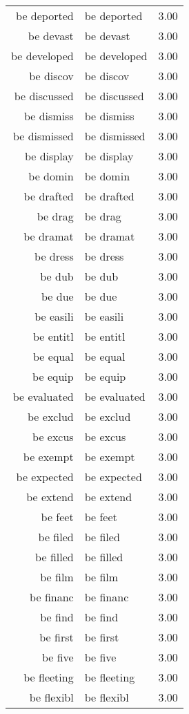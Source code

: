 \begin{table}[ht]
\begin{tabular}{rlr}
  be deported & be deported & 3.00 \\ 
  be devast & be devast & 3.00 \\ 
  be developed & be developed & 3.00 \\ 
  be discov & be discov & 3.00 \\ 
  be discussed & be discussed & 3.00 \\ 
  be dismiss & be dismiss & 3.00 \\ 
  be dismissed & be dismissed & 3.00 \\ 
  be display & be display & 3.00 \\ 
  be domin & be domin & 3.00 \\ 
  be drafted & be drafted & 3.00 \\ 
  be drag & be drag & 3.00 \\ 
  be dramat & be dramat & 3.00 \\ 
  be dress & be dress & 3.00 \\ 
  be dub & be dub & 3.00 \\ 
  be due & be due & 3.00 \\ 
  be easili & be easili & 3.00 \\ 
  be entitl & be entitl & 3.00 \\ 
  be equal & be equal & 3.00 \\ 
  be equip & be equip & 3.00 \\ 
  be evaluated & be evaluated & 3.00 \\ 
  be exclud & be exclud & 3.00 \\ 
  be excus & be excus & 3.00 \\ 
  be exempt & be exempt & 3.00 \\ 
  be expected & be expected & 3.00 \\ 
  be extend & be extend & 3.00 \\ 
  be feet & be feet & 3.00 \\ 
  be filed & be filed & 3.00 \\ 
  be filled & be filled & 3.00 \\ 
  be film & be film & 3.00 \\ 
  be financ & be financ & 3.00 \\ 
  be find & be find & 3.00 \\ 
  be first & be first & 3.00 \\ 
  be five & be five & 3.00 \\ 
  be fleeting & be fleeting & 3.00 \\ 
  be flexibl & be flexibl & 3.00 \\ 

\end{tabular}
\end{table}
